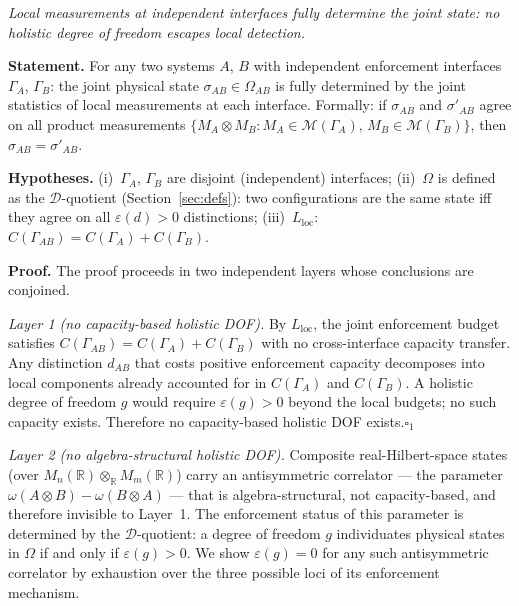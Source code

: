 \documentclass[11pt]{article}
\theoremstyle{remark}
\begin{document}
\begin{tcolorbox}[apfbox, title={$P_{\mathrm{tom}}$: Local Tomographic Closure}]
\textit{Local measurements at independent interfaces fully determine the joint state: no holistic degree of freedom escapes local detection.}

\smallskip\noindent\textbf{Statement.}  For any two systems $A$, $B$ with independent enforcement interfaces $\Gamma_A$, $\Gamma_B$: the joint physical state $\sigma_{AB} \in \Omega_{AB}$ is fully determined by the joint statistics of local measurements at each interface.  Formally: if $\sigma_{AB}$ and $\sigma'_{AB}$ agree on all product measurements $\{M_A \otimes M_B : M_A \in \mathcal{M}(\Gamma_A),\, M_B \in \mathcal{M}(\Gamma_B)\}$, then $\sigma_{AB} = \sigma'_{AB}$.

\smallskip\noindent\textbf{Hypotheses.} (i)~$\Gamma_A$, $\Gamma_B$ are disjoint (independent) interfaces; (ii)~$\Omega$ is defined as the $\mathcal{D}$-quotient (Section~\ref{sec:defs}): two configurations are the same state iff they agree on all $\varepsilon(d) > 0$ distinctions; (iii)~$L_{\mathrm{loc}}$: $C(\Gamma_{AB}) = C(\Gamma_A) + C(\Gamma_B)$.

\smallskip\noindent\textbf{Proof.}  The proof proceeds in two independent layers whose conclusions are conjoined.

\textit{Layer 1 (no capacity-based holistic DOF).}  By $L_{\mathrm{loc}}$, the joint enforcement budget satisfies $C(\Gamma_{AB}) = C(\Gamma_A) + C(\Gamma_B)$ with no cross-interface capacity transfer.  Any distinction $d_{AB}$ that costs positive enforcement capacity decomposes into local components already accounted for in $C(\Gamma_A)$ and $C(\Gamma_B)$.  A holistic degree of freedom $g$ would require $\varepsilon(g) > 0$ beyond the local budgets; no such capacity exists.  Therefore no capacity-based holistic DOF exists.\hfill$\square_1$

\textit{Layer 2 (no algebra-structural holistic DOF).}  Composite real-Hilbert-space states (over $M_n(\mathbb{R}) \otimes_\mathbb{R} M_m(\mathbb{R})$) carry an antisymmetric correlator --- the parameter $\omega(A \otimes B) - \omega(B \otimes A)$ --- that is algebra-structural, not capacity-based, and therefore invisible to Layer~1.  The enforcement status of this parameter is determined by the $\mathcal{D}$-quotient: a degree of freedom $g$ individuates physical states in $\Omega$ if and only if $\varepsilon(g) > 0$.  We show $\varepsilon(g) = 0$ for any such antisymmetric correlator by exhaustion over the three possible loci of its enforcement mechanism.


\end{tcolorbox}
\end{document}
